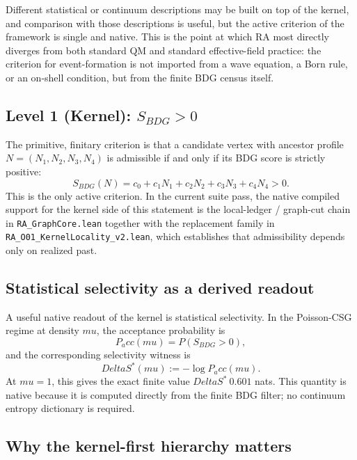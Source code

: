 \documentclass[11pt]{article}
\def\Delta{Delta}%
\def\mu{mu}%
\def\mathrm#1{#1}%
\def\mathbf#1{#1}%
\def\mathbb#1{#1}%
\def\approx{~}%
\def\Pacc{P_acc}%
\newcommand{\Pacc}{\ensuremath{P_{\mathrm{acc}}}}
\begin{document}
Different statistical or continuum descriptions may be built on top of the kernel, and comparison with those descriptions is useful, but the active criterion of the framework is single and native. This is the point at which RA most directly diverges from both standard QM and standard effective-field practice: the criterion for event-formation is not imported from a wave equation, a Born rule, or an on-shell condition, but from the finite BDG census itself.

\subsection{Level 1 (Kernel): $S_{\mathrm{BDG}} > 0$}

The primitive, finitary criterion is that a candidate vertex with ancestor profile $\mathbf{N}=(N_1,N_2,N_3,N_4)$ is admissible if and only if its BDG score is strictly positive:
\begin{equation}
\label{eq:level1}
S_{\mathrm{BDG}}(\mathbf{N}) = c_0 + c_1 N_1 + c_2 N_2 + c_3 N_3 + c_4 N_4 > 0.
\end{equation}
This is the only active criterion. In the current suite pass, the native compiled support for the kernel side of this statement is the local-ledger / graph-cut chain in \texttt{RA\_GraphCore.lean} together with the replacement family in \texttt{RA\_O01\_KernelLocality\_v2.lean}, which establishes that admissibility depends only on realized past.

\subsection{Statistical selectivity as a derived readout}

A useful native readout of the kernel is statistical selectivity. In the Poisson-CSG regime at density $\mu$, the acceptance probability is
\[
\Pacc(\mu)=\mathbb{P}(S_{\mathrm{BDG}}>0),
\]
and the corresponding selectivity witness is
\[
\Delta S^*(\mu):=-\log \Pacc(\mu).
\]
At $\mu=1$, this gives the exact finite value $\Delta S^*\approx 0.601$ nats. This quantity is native because it is computed directly from the finite BDG filter; no continuum entropy dictionary is required.

\subsection{Why the kernel-first hierarchy matters}
\end{document}
